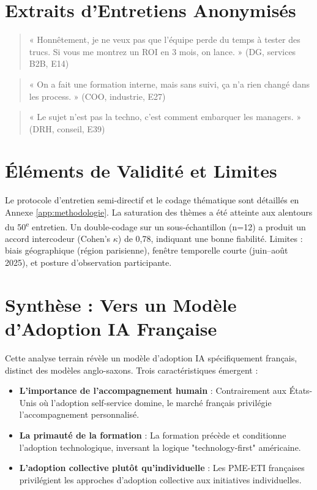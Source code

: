 \section{Extraits d'Entretiens Anonymisés}
\label{sec:quotes}
\begin{quote}
« Honnêtement, je ne veux pas que l'équipe perde du temps à tester des trucs. Si vous me montrez un ROI en 3 mois, on lance. » (DG, services B2B, E14)
\end{quote}
\begin{quote}
« On a fait une formation interne, mais sans suivi, ça n'a rien changé dans les process. » (COO, industrie, E27)
\end{quote}
\begin{quote}
« Le sujet n'est pas la techno, c'est comment embarquer les managers. » (DRH, conseil, E39)
\end{quote}

\section{Éléments de Validité et Limites}
\label{sec:validite}
Le protocole d'entretien semi-directif et le codage thématique sont détaillés en Annexe \ref{app:methodologie}. La saturation des thèmes a été atteinte aux alentours du 50\textsuperscript{e} entretien. Un double-codage sur un sous-échantillon (n=12) a produit un accord intercodeur (Cohen's $\kappa$) de 0{,}78, indiquant une bonne fiabilité. Limites : biais géographique (région parisienne), fenêtre temporelle courte (juin–août 2025), et posture d'observation participante.

\section{Synthèse : Vers un Modèle d'Adoption IA Française}

Cette analyse terrain révèle un modèle d'adoption IA spécifiquement français, distinct des modèles anglo-saxons. Trois caractéristiques émergent :

\begin{itemize}
    \item \textbf{L'importance de l'accompagnement humain} : Contrairement aux États-Unis où l'adoption self-service domine, le marché français privilégie l'accompagnement personnalisé.
    \item \textbf{La primauté de la formation} : La formation précède et conditionne l'adoption technologique, inversant la logique "technology-first" américaine.
    \item \textbf{L'adoption collective plutôt qu'individuelle} : Les PME-ETI françaises privilégient les approches d'adoption collective aux initiatives individuelles.
\end{itemize}
